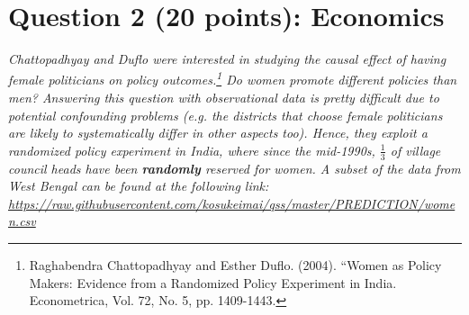 \documentclass[12pt,letterpaper]{article}
\begin{document}
\newpage

\section*{Question 2 (20 points): Economics}
\textit{Chattopadhyay and Duflo were interested in studying the causal effect of having female politicians on policy outcomes.\footnote{Raghabendra Chattopadhyay and Esther Duflo. (2004). ``Women as Policy Makers: Evidence from a Randomized Policy Experiment in India. Econometrica, Vol. 72, No. 5, pp. 1409-1443.} Do women promote different policies than men? Answering this question with observational data is pretty difficult due to potential confounding problems (e.g. the districts that choose female politicians are likely to systematically differ in other aspects too). Hence, they exploit a randomized policy experiment in India, where since the mid-1990s, $\frac{1}{3}$ of village council heads have been {\bf{randomly}} reserved for women. A subset of the data from West Bengal can be found at the following link: \url{https://raw.githubusercontent.com/kosukeimai/qss/master/PREDICTION/women.csv}}\\
\end{document}
